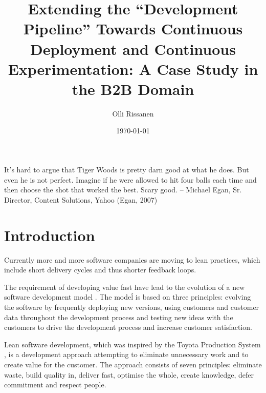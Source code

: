 \documentclass[english]{tktltiki2}
\title{Extending the “Development Pipeline” Towards Continuous Deployment and Continuous Experimentation: A Case Study in the B2B Domain}
\author{Olli Rissanen}
\date{\today}
\theoremstyle{definition}
\theoremstyle{remark}
\begin{document}

\frontmatter      %

\maketitle        %
\makeabstract     %

\tableofcontents  %


\newpage

It’s hard to argue that Tiger Woods is pretty darn good at what he does. But even he is not perfect. Imagine if
he were allowed to hit four balls each time and then choose the shot that worked the best. Scary good.
-- Michael Egan, Sr. Director, Content Solutions, Yahoo (Egan, 2007)

\mainmatter       %



 

\section{Introduction} %
Currently more and more software companies are moving to lean practices, which include short delivery cycles and thus shorter feedback loops. 

The requirement of developing value fast have lead to the evolution of a new software development model \cite{bosch2012building}. The modeĺ is based on three principles: evolving the software by frequently deploying new versions, using customers and customer data throughout the development process and testing new ideas with the customers to drive the development process and increase customer satisfaction.

Lean software development, which was inspired by the Toyota Production System \cite{}, is a development approach attempting to eliminate unnecessary work and to create value for the customer. The approach consists of seven principles: eliminate waste, build quality in, deliver fast, optimise the whole, create knowledge, defer commitment and respect people. 
\end{document}
